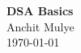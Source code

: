 \begin{titlepage}
    \thispagestyle{empty} %
    \centering
    \vfill                %
    \begin{center}
        {\Huge \textbf{DSA Basics}}\\
        \vspace{1cm}
        {\Large Anchit Mulye}\\
        \vspace{0.5cm}
        {\Large \today}
    \end{center}
    \vfill                %
\end{titlepage}